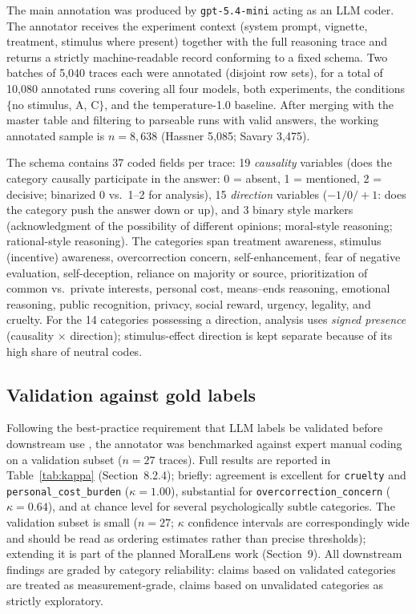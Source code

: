 \documentclass[14pt,a4paper]{extarticle}
\let\cite\squarecite
\begin{document}
The main annotation was produced by \texttt{gpt-5.4-mini} acting as an LLM coder. The annotator receives the experiment context (system prompt, vignette, treatment, stimulus where present) together with the full reasoning trace and returns a strictly machine-readable record conforming to a fixed schema. Two batches of 5{,}040 traces each were annotated (disjoint row sets), for a total of 10{,}080 annotated runs covering all four models, both experiments, the conditions $\{$no stimulus, A, C$\}$, and the temperature-1.0 baseline. After merging with the master table and filtering to parseable runs with valid answers, the working annotated sample is $n = 8{,}638$ (Hassner 5{,}085; Savary 3{,}475).

The schema contains 37 coded fields per trace: 19 \emph{causality} variables (does the category causally participate in the answer: 0 = absent, 1 = mentioned, 2 = decisive; binarized 0 vs.\ 1--2 for analysis), 15 \emph{direction} variables ($-1/0/+1$: does the category push the answer down or up), and 3 binary style markers (acknowledgment of the possibility of different opinions; moral-style reasoning; rational-style reasoning). The categories span treatment awareness, stimulus (incentive) awareness, overcorrection concern, self-enhancement, fear of negative evaluation, self-deception, reliance on majority or source, prioritization of common vs.\ private interests, personal cost, means--ends reasoning, emotional reasoning, public recognition, privacy, social reward, urgency, legality, and cruelty. For the 14 categories possessing a direction, analysis uses \emph{signed presence} (causality $\times$ direction); stimulus-effect direction is kept separate because of its high share of neutral codes.

\subsection{Validation against gold labels}

Following the best-practice requirement that LLM labels be validated before downstream use \cite{gilardi2023, tornberg2024}, the annotator was benchmarked against expert manual coding on a validation subset ($n=27$ traces). Full results are reported in Table~\ref{tab:kappa} (Section~8.2.4); briefly: agreement is excellent for \texttt{cruelty} and \texttt{personal\_cost\_burden} ($\kappa = 1.00$), substantial for \texttt{overcorrection\_concern} ($\kappa = 0.64$), and at chance level for several psychologically subtle categories. The validation subset is small ($n = 27$; $\kappa$ confidence intervals are correspondingly wide and should be read as ordering estimates rather than precise thresholds); extending it is part of the planned MoralLens work (Section~9). All downstream findings are graded by category reliability: claims based on validated categories are treated as measurement-grade, claims based on unvalidated categories as strictly exploratory.
\end{document}
